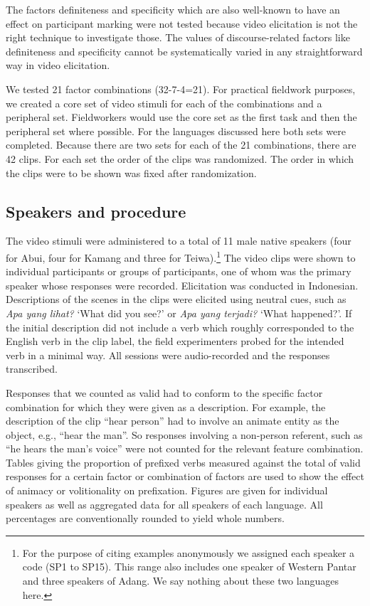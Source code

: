   The factors definiteness  and specificity  which are also well-known to have an effect on participant marking \citep{Aissen2003} were not tested because video elicitation is not the right technique to investigate those. The values of discourse-related factors like definiteness and specificity cannot be systematically varied in any straightforward way in video elicitation.

We tested 21 factor combinations (32-7-4=21). For practical fieldwork purposes, we created a core set of video stimuli for each of the combinations and a peripheral set. Fieldworkers would use the core set as the first task and then the peripheral set where possible. For the languages discussed here both sets were completed. Because there are two sets for each of the 21 combinations, there are 42 clips. For each set the order of the clips was randomized. The order in which the clips were to be shown was fixed after randomization. 

\subsection{Speakers and procedure}
\label{sec:10:4.2}
The video stimuli were administered to a total of 11 male native speakers (four for Abui, four for Kamang  and three for Teiwa).\footnote{For the purpose of citing examples anonymously we assigned each speaker a code (SP1 to SP15). This range also includes one speaker of Western Pantar and three speakers of Adang. We say nothing about these two languages here.} The video clips were shown to individual participants or groups of participants, one of whom was the primary speaker whose responses were recorded. Elicitation was conducted in Indonesian. Descriptions of the scenes in the clips were elicited using neutral cues, such as \textit{Apa yang lihat?} `What did you see?' or \textit{Apa yang terjadi?} `What happened?'. If the initial description did not include a verb which roughly corresponded to the English verb in the clip label, the field experimenters probed for the intended verb in a minimal way. All sessions were audio-recorded and the responses transcribed.

  Responses that we counted as valid had to conform to the specific factor combination for which they were given as a description. For example, the description of the clip ``hear person'' had to involve an animate entity as the object, e.g., ``hear the man''. So responses involving a non-person referent, such as ``he hears the man's voice'' were not counted for the relevant feature combination. Tables giving the proportion of prefixed verbs measured against the total of valid responses for a certain factor or combination of factors are used to show the effect of animacy or volitionality on prefixation. Figures are given for individual speakers as well as aggregated data for all speakers of each language. All percentages are conventionally rounded to yield whole numbers.

